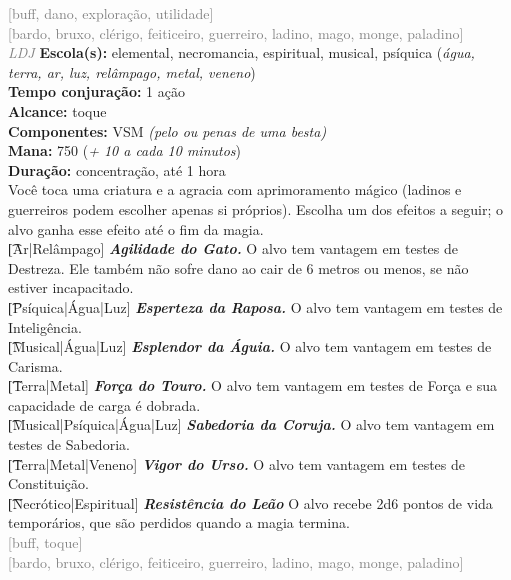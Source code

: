 \documentclass{RPG_Adventure}[2021/10/20]
\begin{document}
{\scriptsize \textcolor{gray}{[buff, dano, exploração, utilidade]\\}}
{\scriptsize \textcolor{gray}{[bardo, bruxo, clérigo, feiticeiro, guerreiro, ladino, mago, monge, paladino]\\}}
{\tiny \textcolor{gray}{\textit{LDJ}}}
{\small \t \textbf{Escola(s):} elemental, necromancia, espiritual, musical, psíquica (\textit{água, terra, ar, luz, relâmpago, metal, veneno})\\\t \textbf{Tempo conjuração:} 1 ação\\\t \textbf{Alcance:} toque\\\t \textbf{Componentes:} VSM \textit{(pelo ou penas de uma besta)}\\\t \textbf{Mana:} 750 (\textit{+ 10 a cada 10 minutos})\\\t \textbf{Duração:} concentração, até 1 hora\\}
{\normalsize Você toca uma criatura e a agracia com aprimoramento mágico (ladinos e guerreiros podem escolher apenas si próprios). Escolha um dos efeitos a seguir; o alvo ganha esse efeito até o fim da magia.\\\t [Ar|Relâmpago] \textbf{\textit{Agilidade do Gato.}} O alvo tem vantagem em testes de Destreza. Ele também não sofre dano ao cair de 6 metros ou menos, se não estiver incapacitado.\\\t [Psíquica|Água|Luz] \textbf{\textit{Esperteza da Raposa.}} O alvo tem vantagem em testes de Inteligência.\\\t [Musical|Água|Luz] \textbf{\textit{Esplendor da Águia.}} O alvo tem vantagem em testes de Carisma.\\\t [Terra|Metal] \textbf{\textit{Força do Touro.}} O alvo tem vantagem em testes de Força e sua capacidade de carga é dobrada.  \\\t [Musical|Psíquica|Água|Luz] \textbf{\textit{Sabedoria da Coruja.}} O alvo tem vantagem em testes de Sabedoria.\\\t [Terra|Metal|Veneno] \textbf{\textit{Vigor do Urso.}} O alvo tem vantagem em testes de Constituição.\\\t [Necrótico|Espiritual] \textbf{\textit{Resistência do Leão}} O alvo recebe 2d6 pontos de vida temporários, que são perdidos quando a magia termina.\\}
{\scriptsize \textcolor{gray}{[buff, toque]\\}}
{\scriptsize \textcolor{gray}{[bardo, bruxo, clérigo, feiticeiro, guerreiro, ladino, mago, monge, paladino]\\}}
\end{document}
